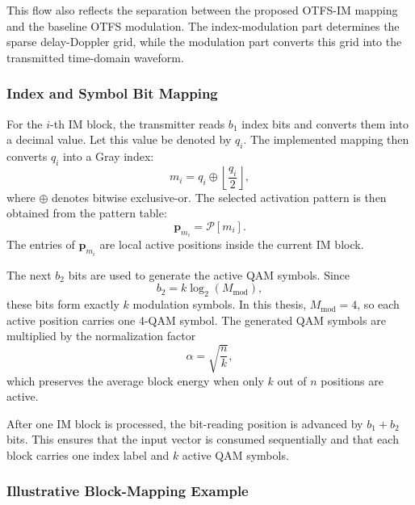 This flow also reflects the separation between the proposed OTFS-IM mapping and the baseline OTFS modulation. The index-modulation part determines the sparse delay-Doppler grid, while the modulation part converts this grid into the transmitted time-domain waveform.

\subsubsection{Index and Symbol Bit Mapping}

For the \(i\)-th IM block, the transmitter reads \(b_1\) index bits and converts them into a decimal value. Let this value be denoted by \(q_i\). The implemented mapping then converts \(q_i\) into a Gray index:
\begin{equation}
    m_i
    =
    q_i
    \oplus
    \left\lfloor
    \frac{q_i}{2}
    \right\rfloor ,
    \label{eq:tx_gray_index}
\end{equation}
where \(\oplus\) denotes bitwise exclusive-or.
The selected activation pattern is then obtained from the pattern table:
\begin{equation}
    \mathbf{p}_{m_i}
    =
    \mathcal{P}[m_i].
    \label{eq:tx_pattern_selection}
\end{equation}
The entries of \(\mathbf{p}_{m_i}\) are local active positions inside the current IM block.

The next \(b_2\) bits are used to generate the active QAM symbols. Since
\begin{equation}
    b_2 = k\log_2(M_{\mathrm{mod}}),
\end{equation}
these bits form exactly \(k\) modulation symbols. In this thesis, \(M_{\mathrm{mod}}=4\), so each active position carries one 4-QAM symbol. The generated QAM symbols are multiplied by the normalization factor
\begin{equation}
    \alpha = \sqrt{\frac{n}{k}},
\end{equation}
which preserves the average block energy when only \(k\) out of \(n\) positions are active.

After one IM block is processed, the bit-reading position is advanced by \(b_1+b_2\) bits. This ensures that the input vector is consumed sequentially and that each block carries one index label and \(k\) active QAM symbols.

\subsubsection{Illustrative Block-Mapping Example}

